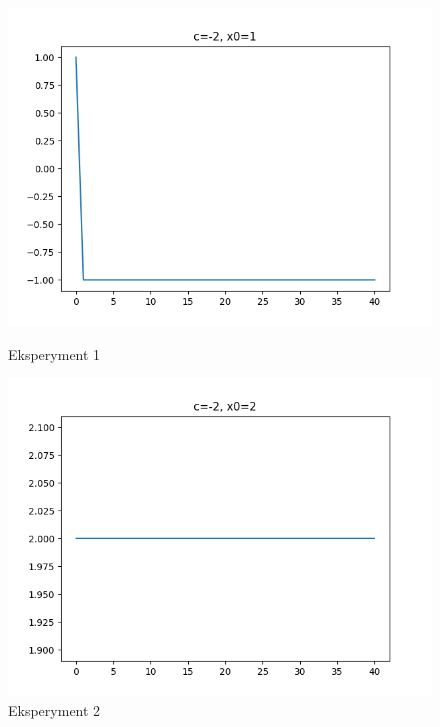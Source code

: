 \documentclass[12pt]{article}
\begin{document}
\begin{figure}[!htb]
  \includegraphics[width=\linewidth]{1.png}
  \caption{Eksperyment 1}
\endminipage\hfill
{}
  \includegraphics[width=\linewidth]{2.png}
  \caption{Eksperyment 2}
\endminipage
\end{figure}
\end{document}
